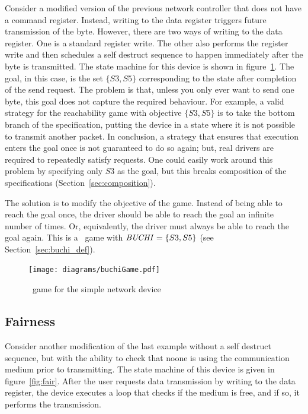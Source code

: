 Consider a modified version of the previous network controller that does not have a command register. Instead, writing to the data register triggers future transmission of the byte. However, there are two ways of writing to the data register. One is a standard register write. The other also performs the register write and then schedules a self destruct sequence to happen immediately after the byte is transmitted. The state machine for this device is shown in figure~\ref{fig:buchi}. The goal, in this case, is the set $\{S3, S5\}$ corresponding to the state after completion of the send request. The problem is that, unless you only ever want to send one byte, this goal does not capture the required behaviour. For example, a valid strategy for the reachability game with objective $\{S3, S5\}$ is to take the bottom branch of the specification, putting the device in a state where it is not possible to transmit another packet. In conclusion, a strategy that ensures that execution enters the goal once is not guaranteed to do so again; but, real drivers are required to repeatedly satisfy requests. One could easily work around this problem by specifying only ${S3}$ as the goal, but this breaks composition of the specifications (Section~\ref{sec:composition}).

The solution is to modify the objective of the game. Instead of being able to reach the goal once, the driver should be able to reach the goal an infinite number of times. Or, equivalently, the driver must always be able to reach the goal again. This is a \buchi\ game with $\mathit{BUCHI} = \{S3, S5\}$ (see Section~\ref{sec:buchi_def}).

\begin{figure}
\centering
\texttt{[image: diagrams/buchiGame.pdf]}
\caption{\buchi\ game for the simple network device}
\label{fig:buchi}
\end{figure}

\subsection{Fairness}
\label{sec:game_fairness}

Consider another modification of the last example without a self destruct sequence, but with the ability to check that noone is using the communication medium prior to transmitting. The state machine of this device is given in figure~\ref{fig:fair}. After the user requests data transmission by writing to the data register, the device executes a loop that checks if the medium is free, and if so, it performs the transmission. 

